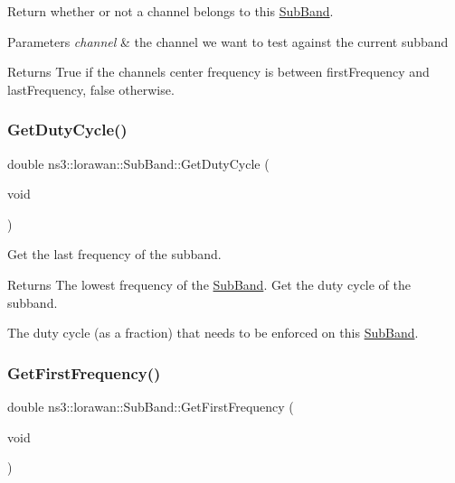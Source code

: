 Return whether or not a channel belongs to this \hyperlink{classns3_1_1lorawan_1_1SubBand}{Sub\+Band}.


\begin{DoxyParams}{Parameters}
{\em channel} & the channel we want to test against the current subband \\
\hline
\end{DoxyParams}
\begin{DoxyReturn}{Returns}
True if the channel\textquotesingle{}s center frequency is between first\+Frequency and last\+Frequency, false otherwise. 
\end{DoxyReturn}
\mbox{\label{classns3_1_1lorawan_1_1SubBand_a4777b7540f6ce04df576395823f0d4d2}} 
\subsubsection{\texorpdfstring{Get\+Duty\+Cycle()}{GetDutyCycle()}}
{\footnotesize\ttfamily double ns3\+::lorawan\+::\+Sub\+Band\+::\+Get\+Duty\+Cycle (\begin{DoxyParamCaption}\item[{void}]{ }\end{DoxyParamCaption})}

Get the last frequency of the subband.

\begin{DoxyReturn}{Returns}
The lowest frequency of the \hyperlink{classns3_1_1lorawan_1_1SubBand}{Sub\+Band}. Get the duty cycle of the subband.

The duty cycle (as a fraction) that needs to be enforced on this \hyperlink{classns3_1_1lorawan_1_1SubBand}{Sub\+Band}. 
\end{DoxyReturn}
\mbox{\label{classns3_1_1lorawan_1_1SubBand_a56fd6d9c25be89a8c7df74c0c675ae79}} 
\subsubsection{\texorpdfstring{Get\+First\+Frequency()}{GetFirstFrequency()}}
{\footnotesize\ttfamily double ns3\+::lorawan\+::\+Sub\+Band\+::\+Get\+First\+Frequency (\begin{DoxyParamCaption}\item[{void}]{ }\end{DoxyParamCaption})}

